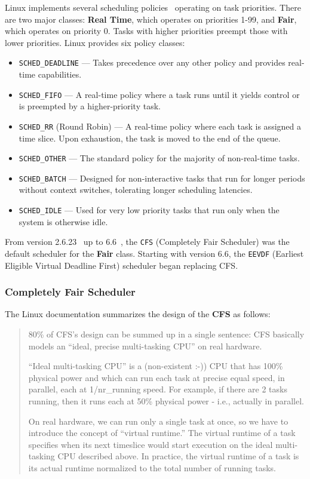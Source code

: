 \documentclass[a4paper,10pt,twoside]{report}
\theoremstyle{definition}
\begin{document}
Linux implements several scheduling policies~\cite{linux_policies, linux_cfs} operating on task priorities. There are two major classes: \textbf{Real Time}, which operates on priorities 1-99, and \textbf{Fair}, which operates on priority 0. Tasks with higher priorities preempt those with lower priorities. Linux provides six policy classes:

\begin{itemize}
    \item \texttt{SCHED\_DEADLINE} --- Takes precedence over any other policy and provides real-time capabilities.
    \item \texttt{SCHED\_FIFO} --- A real-time policy where a task runs until it yields control or is preempted by a higher-priority task.
    \item \texttt{SCHED\_RR} (Round Robin) --- A real-time policy where each task is assigned a time slice. Upon exhaustion, the task is moved to the end of the queue.
    \item \texttt{SCHED\_OTHER} --- The standard policy for the majority of non-real-time tasks.
    \item \texttt{SCHED\_BATCH} --- Designed for non-interactive tasks that run for longer periods without context switches, tolerating longer scheduling latencies.
    \item \texttt{SCHED\_IDLE} --- Used for very low priority tasks that run only when the system is otherwise idle.
\end{itemize}

From version 2.6.23~\cite{linux_cfs} up to 6.6~\cite{linux_eevdf}, the \texttt{CFS} (Completely Fair Scheduler) was the default scheduler for the \textbf{Fair} class. Starting with version 6.6, the \texttt{EEVDF} (Earliest Eligible Virtual Deadline First) scheduler began replacing CFS.

\subsubsection{Completely Fair Scheduler}
The Linux documentation summarizes the design of the \textbf{CFS} as follows:

\begin{quote}
80\% of CFS's design can be summed up in a single sentence: CFS basically models an “ideal, precise multi-tasking CPU” on real hardware.

“Ideal multi-tasking CPU” is a (non-existent :-)) CPU that has 100\% physical power and which can run each task at precise equal speed, in parallel, each at 1/nr\_running speed. For example, if there are 2 tasks running, then it runs each at 50\% physical power - i.e., actually in parallel.
    
On real hardware, we can run only a single task at once, so we have to introduce the concept of “virtual runtime.” The virtual runtime of a task specifies when its next timeslice would start execution on the ideal multi-tasking CPU described above. In practice, the virtual runtime of a task is its actual runtime normalized to the total number of running tasks.
\cite{linux_cfs}
\end{quote}
\end{document}
